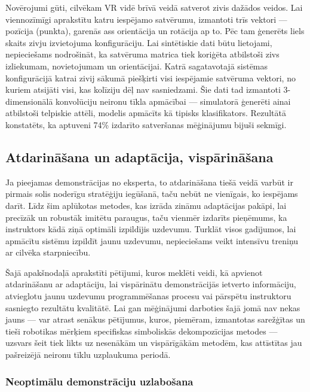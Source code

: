 \documentclass[12pt, a4paper]{article}
\numberwithin{equation}{section} %
\begin{document}
Novērojumi gūti, cilvēkam VR vidē brīvā veidā satverot zivis dažādos veidos. Lai viennozīmīgi aprakstītu katru iespējamo satvērumu, izmantoti trīs vektori --- pozīcija (punkta), garenās ass orientācija un rotācija ap to.  Pēc tam ģenerēts liels skaits zivju izvietojuma konfigurāciju. Lai sintētiskie dati būtu lietojami, nepieciešams nodrošināt, ka satvēruma matrica tiek koriģēta atbilstoši zivs izliekumam, novietojumam un orientācijai. Katrā sagatavotajā sistēmas konfigurācijā katrai zivij sākumā piešķirti visi iespējamie satvēruma vektori, no kuriem atsijāti visi, kas kolīziju dēļ nav sasniedzami. Šie dati tad izmantoti 3-dimensionālā konvolūciju neironu tīkla apmācībai --- simulatorā ģenerēti ainai atbilstoši telpiskie attēli, modelis apmācīts kā tipisks klasifikators. Rezultātā konstatēts, ka aptuveni 74\% izdarīto satveršanas mēģinājumu bijuši sekmīgi.

\subsection{Atdarināšana un adaptācija, vispārināšana}

Ja pieejamas demonstrācijas no eksperta, to atdarināšana tiešā veidā varbūt ir pirmais solis noderīgu stratēģiju iegūšanā, taču nebūt ne vienīgais, ko iespējams darīt. Līdz šim aplūkotas metodes, kas izrāda zināmu adaptācijas pakāpi, lai precīzāk un robustāk imitētu paraugus, taču vienmēr izdarīts pieņēmums, ka instruktors kādā ziņā optimāli izpildījis uzdevumu. Turklāt visos gadījumos, lai apmācītu sistēmu izpildīt jaunu uzdevumu, nepieciešams veikt intensīvu treniņu ar cilvēka starpniecību. 

Šajā apakšnodaļā aprakstīti pētījumi, kuros meklēti veidi, kā apvienot atdarināšanu ar adaptāciju, lai vispārinātu demonstrācijās ietverto informāciju, atvieglotu jaunu uzdevumu programmēšanas procesu vai pārspētu instruktoru sasniegto rezultātu kvalitātē. Lai gan mēģinājumi darboties šajā jomā nav nekas jauns --- var atrast senākus pētījumus, kuros, piemēram, izmantotas sarežģītas un tieši robotikas mērķiem specifiskas simboliskās dekompozīcijas metodes \cite{pastor2011skill} --- uzsvars šeit tiek likts uz nesenākām un vispārīgākām metodēm, kas attīstītas jau pašreizējā neironu tīklu uzplaukuma periodā.

\subsubsection{Neoptimālu demonstrāciju uzlabošana}
\end{document}
